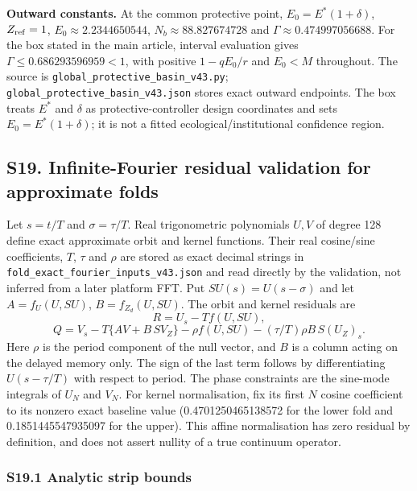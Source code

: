 \documentclass[
  10pt,
  a4paper,
]{article}
\begin{document}
\textbf{Outward constants.} At the common protective point,
\(E_0=E^*(1+\delta)\), \(Z_{\rm ref}=1\), \(E_0\approx2.2344650544\),
\(N_b\approx88.827674728\) and \(\Gamma\approx0.474997056688\). For the
box stated in the main article, interval evaluation gives
\(\Gamma\le0.686293596959<1\), with positive \(1-qE_0/r\) and \(E_0<M\)
throughout. The source is \texttt{global\_protective\_basin\_v43.py};
\texttt{global\_protective\_basin\_v43.json} stores exact outward
endpoints. The box treats \(E^*\) and \(\delta\) as
protective-controller design coordinates and sets \(E_0=E^*(1+\delta)\);
it is not a fitted ecological/institutional confidence region.

\subsection{S19. Infinite-Fourier residual validation for approximate
folds}\label{s19.-infinite-fourier-residual-validation-for-approximate-folds}

Let \(s=t/T\) and \(\sigma=\tau/T\). Real trigonometric polynomials
\(U,V\) of degree 128 define exact approximate orbit and kernel
functions. Their real cosine/sine coefficients, \(T\), \(\tau\) and
\(\rho\) are stored as exact decimal strings in
\texttt{fold\_exact\_fourier\_inputs\_v43.json} and read directly by the
validation, not inferred from a later platform FFT. Put
\(SU(s)=U(s-\sigma)\) and let \(A=f_U(U,SU)\), \(B=f_{Z_d}(U,SU)\). The
orbit and kernel residuals are \[R=U_s-Tf(U,SU),\]
\[Q=V_s-T\{AV+B\,SV_Z\}-\rho f(U,SU)-(\tau/T)\rho B\,S(U_Z)_s.\] Here
\(\rho\) is the period component of the null vector, and \(B\) is a
column acting on the delayed memory only. The sign of the last term
follows by differentiating \(U(s-\tau/T)\) with respect to period. The
phase constraints are the sine-mode integrals of \(U_N\) and \(V_N\).
For kernel normalisation, fix its first \(N\) cosine coefficient to its
nonzero exact baseline value (0.4701250465138572 for the lower fold and
0.1851445547935097 for the upper). This affine normalisation has zero
residual by definition, and does not assert nullity of a true continuum
operator.

\subsubsection{S19.1 Analytic strip
bounds}\label{s19.1-analytic-strip-bounds}
\end{document}
